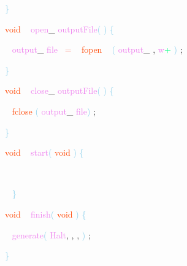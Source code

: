 \documentclass[8, usernames, dvipsnames]{beamer}
\begin{document}
\begin{frame}
\textcolor{SkyBlue}{\} }

 
 
 
 \textcolor{OrangeRed}{void}
\textcolor{White}{\ }
\textcolor{Violet}{open}\textcolor{Sepia}{\_}
\textcolor{Violet}{outputFile}\textcolor{SkyBlue}{(}
\textcolor{SkyBlue}{)}
\textcolor{SkyBlue}{\{ }

 \textcolor{White}{\   }
\textcolor{Violet}{output}\textcolor{Sepia}{\_}
\textcolor{Violet}{file}\textcolor{White}{\ }
\textcolor{Salmon}{=}
\textcolor{White}{\ }
\textcolor{OrangeRed}{fopen}
\textcolor{White}{\ }
\textcolor{SkyBlue}{(}
\textcolor{Violet}{output}\textcolor{Sepia}{\_}
\textcolor{Sepia}{,}
\textcolor{Violet}{w}\textcolor{SpringGreen}{+}
\textcolor{SkyBlue}{)}
\textcolor{Sepia}{;}

 \textcolor{SkyBlue}{\} }

 
 \textcolor{OrangeRed}{void}
\textcolor{White}{\ }
\textcolor{Violet}{close}\textcolor{Sepia}{\_}
\textcolor{Violet}{outputFile}\textcolor{SkyBlue}{(}
\textcolor{SkyBlue}{)}
\textcolor{SkyBlue}{\{ }

 \textcolor{White}{\   }
\textcolor{OrangeRed}{fclose}
\textcolor{SkyBlue}{(}
\textcolor{Violet}{output}\textcolor{Sepia}{\_}
\textcolor{Violet}{file}\textcolor{SkyBlue}{)}
\textcolor{Sepia}{;}

 \end{frame}
\begin{frame}
\textcolor{SkyBlue}{\} }

 
 \textcolor{OrangeRed}{void}
\textcolor{White}{\ }
\textcolor{Violet}{start}\textcolor{SkyBlue}{(}
\textcolor{OrangeRed}{void}
\textcolor{SkyBlue}{)}
\textcolor{SkyBlue}{\{ }

 \textcolor{White}{\   }

 \textcolor{White}{\   }
\textcolor{SkyBlue}{\} }

 
 \textcolor{OrangeRed}{void}
\textcolor{White}{\ }
\textcolor{Violet}{finish}\textcolor{SkyBlue}{(}
\textcolor{OrangeRed}{void}
\textcolor{SkyBlue}{)}
\textcolor{SkyBlue}{\{ }

 \textcolor{White}{\   }
\textcolor{Violet}{generate}\textcolor{SkyBlue}{(}
\textcolor{Violet}{Halt}\textcolor{Sepia}{,}
\textcolor{Sepia}{,}
\textcolor{Sepia}{,}
\textcolor{SkyBlue}{)}
\textcolor{Sepia}{;}

 \textcolor{SkyBlue}{\} }

 
 \end{frame}
\end{document}
